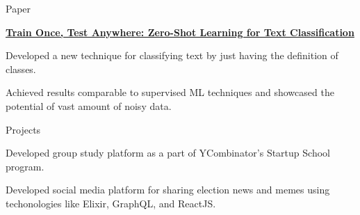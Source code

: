 \documentclass{resume} %
\newcommand{\tab}[1]{\hspace{.2667\textwidth}\rlap{#1}}
\newcommand{\itab}[1]{\hspace{0em}\rlap{#1}}
\begin{document}
\begin{rSection}{Paper}
\begin{rSubsection}{\href{https://arxiv.org/abs/1712.05972}{\textbf{Train Once, Test Anywhere: Zero-Shot Learning for Text Classification}  }}{}{}{}
\item Developed a new technique for classifying text by just having the definition of classes.
\item Achieved results comparable to supervised ML techniques and showcased the potential of vast amount of noisy data.
\end{rSubsection}
\end{rSection}

\begin{rSection}{Projects}
\begin{rSubsection}{}{}{}{}
\item Developed group study platform as a part of YCombinator's Startup School program.
\item Developed social media platform for sharing election news and memes using techonologies like Elixir, GraphQL, and ReactJS.
\end{rSubsection}
\end{rSection}



\end{document}
